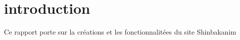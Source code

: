 \section{introduction}
Ce rapport porte sur la créations et les fonctionnalitées du site Shinbakanim
